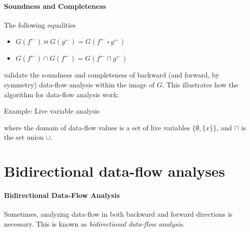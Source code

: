 \documentclass{llncs}
\newcommand{\fb}{{f^{\leftarrow}}}
\newcommand{\gb}{{g^{\leftarrow}}}
\newcommand{\meet}{\sqcap}
\newcommand{\comp}{\circ}
\begin{document}
  \paragraph{Soundness and Completeness}
  The following equalities
  \begin{itemize}
    \item $G(\fb) \bowtie G(\gb) = G(\fb \comp \gb)$
    \item $G(\fb) \cap G(\fb) = G(\fb \meet \gb)$
  \end{itemize}
  validate the soundness and completeness of backward (and forward, by symmetry) data-flow analysis within the image of $G$.  This illustrates how the algorithm for data-flow analysis work:


  Example: Live variable analysis
   \begin{center}
  \end{center}

  where the domain of data-flow values is a set of live variables $\{\emptyset, \{ x \}\}$, and $\meet$ is the set union $\cup$.

\section{Bidirectional data-flow analyses}  

  \paragraph{Bidirectional Data-Flow Analysis}
  Sometimes, analyzing data-flow in both backward and forward directions is necessary. This is known as \emph{bidirectional data-flow analysis}.
\end{document}
